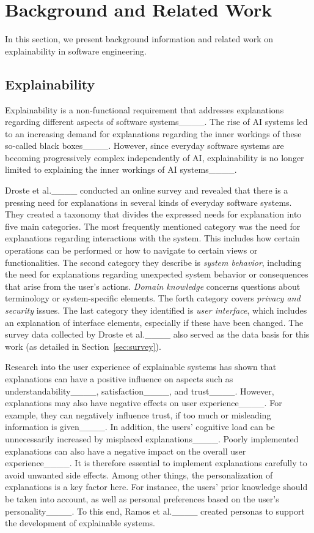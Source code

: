 \section{Background and Related Work}
\label{sec:background}

In this section, we present background information and related work on explainability in software engineering.

\subsection{Explainability}
\label{sec:erklearbarkeit}

Explainability is a non-functional requirement that addresses explanations regarding different aspects of software systems____. The rise of AI systems led to an increasing demand for explanations regarding the inner workings of these so-called black boxes____. However, since everyday software systems are becoming progressively complex independently of AI, explainability is no longer limited to explaining the inner workings of AI systems____. 

Droste et al.____ conducted an online survey and revealed that there is a pressing need for explanations in several kinds of everyday software systems. They created a taxonomy that divides the expressed needs for explanation into five main categories. The most frequently mentioned category was the need for explanations regarding interactions with the system. This includes how certain operations can be performed or how to navigate to certain views or functionalities. The second category they describe is \textit{system behavior}, including the need for explanations regarding unexpected system behavior or consequences that arise from the user's actions. \textit{Domain knowledge} concerns questions about terminology or system-specific elements. The forth category covers \textit{privacy and security} issues. The last category they identified is \textit{user interface}, which includes an explanation of interface elements, especially if these have been changed. The survey data collected by Droste et al.____ also served as the data basis for this work (as detailed in Section~\ref{sec:survey}).

Research into the user experience of explainable systems has shown that explanations can have a positive influence on aspects such as understandability____, satisfaction____, and trust____. However, explanations may also have negative effects on user experience____. For example, they can negatively influence trust, if too much or misleading information is given____. In addition, the users' cognitive load can be unnecessarily increased by misplaced explanations____. Poorly implemented explanations can also have a negative impact on the overall user experience____. It is therefore essential to implement explanations carefully to avoid unwanted side effects. Among other things, the personalization of explanations is a key factor here. For instance, the users' prior knowledge should be taken into account, as well as personal preferences based on the user's personality____. To this end, Ramos et al.____ created personas to support the development of explainable systems.


